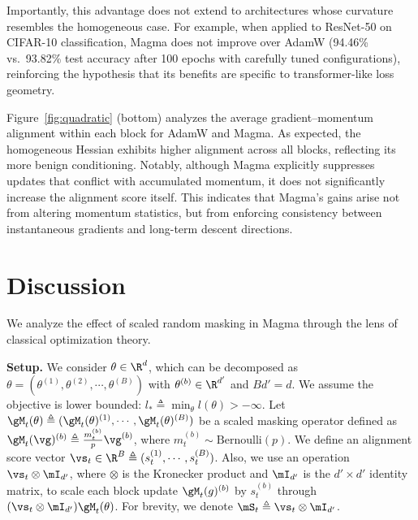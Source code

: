 \documentclass[11pt, a4paper, twocolumn, copyright, goog]{google}
\theoremstyle{plain}
\theoremstyle{definition}
\theoremstyle{remark}
\begin{document}
Importantly, this advantage does not extend to architectures whose curvature resembles the homogeneous case. 
For example, when applied to ResNet-50 on CIFAR-10 classification, Magma does not improve over AdamW (94.46\% vs.\ 93.82\% test accuracy after 100 epochs with carefully tuned configurations), reinforcing the hypothesis that its benefits are specific to transformer-like loss geometry.


Figure~\ref{fig:quadratic} (bottom) analyzes the average gradient–momentum alignment within each block for AdamW and Magma.  
As expected, the homogeneous Hessian exhibits higher alignment across all blocks, reflecting its more benign conditioning.
Notably, although Magma explicitly suppresses updates that conflict with accumulated momentum, it does not significantly increase the alignment score itself.
This indicates that Magma’s gains arise not from altering momentum statistics, but from enforcing consistency between instantaneous gradients and long-term descent directions.



\section{Discussion} \label{sec:convergence_analysis}
We analyze the effect of scaled random masking in Magma through the lens of classical optimization theory. 

\textbf{Setup.}
We consider $\theta \in \R^d$, which can be decomposed as $\theta = (\theta^{(1)}, \theta^{(2)}, \cdots, \theta^{(B)})$ with $\theta^{(b)} \in \R^{d'}$ and $B d' = d$. We assume the objective is lower bounded: $l_* \triangleq \min_\theta l(\theta) > - \infty$. 
Let $\gM_t(\theta) \triangleq (\gM_t(\theta)^{(1)}, \cdots, \gM_t(\theta)^{(B)})$ be a scaled masking operator defined as $\gM_t(\vg)^{(b)} \triangleq \frac{m_{t}^{(b)}}{p} \vg^{(b)}$, where $m_{t}^{(b)} \sim \mathrm{Bernoulli}(p)$. 
We define an alignment score vector $\vs_t \in \R^B \triangleq (s_t^{(1)}, \cdots, s_t^{(B)})$. Also, we use an operation $ \vs_t \otimes \mI_{d'}$, where $\otimes$ is the Kronecker product and $\mI_{d'}$ is the $d' \times d'$ identity matrix, to scale each block update $\gM_t(g)^{(b)}$ by $s_t^{(b)}$ through $(\vs_t \otimes \mI_{d'}) \gM_t(\theta)$. For brevity, we denote $\mS_t \triangleq \vs_t \otimes \mI_{d'}$.
\end{document}

